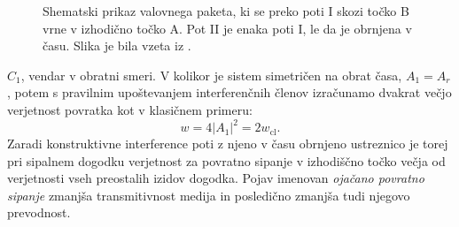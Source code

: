 \begin{minipage}[t]{0.41\textwidth}
\begin{figure}[H]
\caption{Shematski prikaz valovnega paketa, ki se preko poti I skozi točko B vrne v izhodično točko A. Pot II je enaka poti I, le da je obrnjena v času. Slika je bila vzeta iz \cite{lagendijk2009fifty}.}
\label{fig:paths} 
\end{figure}
\end{minipage}
$C_1$, vendar v obratni smeri. V kolikor je sistem simetričen na obrat 
časa, $A_1=A_r$, potem s pravilnim upoštevanjem interferenčnih  členov izračunamo dvakrat večjo verjetnost povratka kot v klasičnem primeru: 
\begin{equation}
w=4\left|A_1\right|^2=2w_\mathrm{cl}.
\end{equation}
Zaradi konstruktivne interference poti z njeno v času obrnjeno ustreznico je torej pri sipalnem dogodku verjetnost za povratno sipanje v izhodiščno točko večja od verjetnosti vseh preostalih izidov dogodka. Pojav imenovan \emph{ojačano povratno sipanje} zmanjša transmitivnost medija in posledično zmanjša tudi njegovo prevodnost. \newpage
